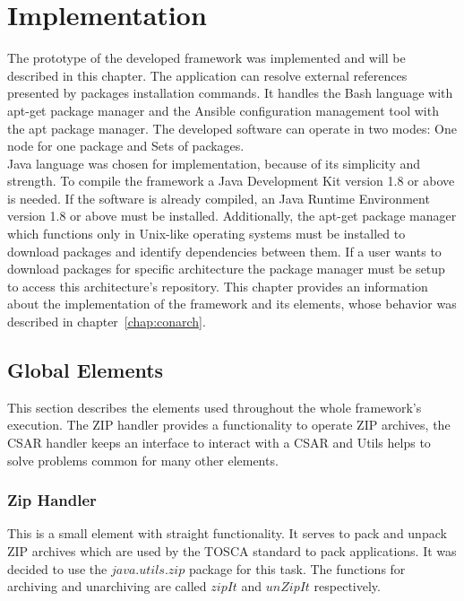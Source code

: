 
\chapter{Implementation}\label{chap:imp}
The prototype of the developed framework was implemented and will be described in this chapter.
The application can resolve external references presented by packages installation commands.
It handles the Bash language with apt-get package manager and the Ansible configuration management tool with the apt package manager.
The developed software can operate in two modes: One node for one package and Sets of packages.\\
Java language was chosen for implementation, because of its simplicity and strength. 
To compile the framework a Java Development Kit version 1.8 or above is needed.
If the software is already compiled, an Java Runtime Environment version 1.8 or above must be installed.
Additionally, the apt-get package manager which functions only in Unix-like operating systems must be installed to download packages and identify dependencies between them. 
If a user wants to download packages for specific architecture the package manager must be setup to access this architecture's repository. 
This chapter provides an information about the implementation of the framework and its elements, whose behavior was described in chapter~\ref{chap:conarch}.
%



\section{Global Elements}
This section describes the elements used throughout the whole framework's execution.
The ZIP handler provides a functionality to operate ZIP archives, the CSAR handler keeps an interface to interact with a CSAR and Utils helps to solve problems common for many other elements.

\subsection*{Zip Handler}
This is a small element with straight functionality. 
It serves to pack and unpack ZIP archives which are used by the TOSCA standard to pack applications.
It was decided to use the $java$.$utils$.$zip$ package for this task.
The functions for archiving and unarchiving are called $zipIt$ and $unZipIt$ respectively. 

